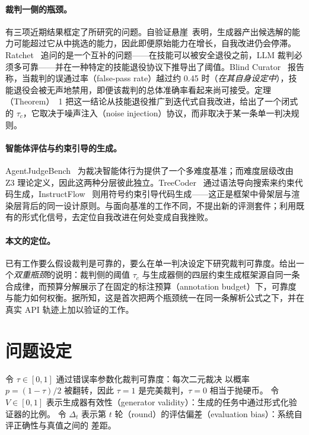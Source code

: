 \documentclass{article}
\begin{document}
\paragraph{裁判一侧的瓶颈。}
有三项近期结果框定了所研究的问题。自验证悬崖~\cite{self_verification_cliff}表明，生成器产出候选解的能力可能超过它从中挑选的能力，因此即便原始能力在增长，自我改进仍会停滞。Ratchet~\cite{ratchet} 追问的是一个互补的问题——在技能可以被安全退役之前，LLM 裁判必须多可靠——并在一种特定的技能退役协议下推导出了阈值。Blind Curator~\cite{blind_curator} 报告称，当裁判的误通过率（false-pass rate）越过约 0.45 时（\textit{在其自身设定中}），技能退役会被无声地禁用，即便该裁判的总体准确率看起来尚可接受。定理（Theorem）~1 把这一结论从技能退役推广到迭代式自我改进，给出了一个闭式的 $\tau_c$，它取决于噪声注入（noise injection）协议，而非取决于某一条单一判决规则。

\paragraph{智能体评估与约束引导的生成。}
AgentJudgeBench~\cite{agentjudgebench} 为裁决智能体行为提供了一个多难度基准；而难度层级改由 Z3 理论定义，因此这两种分层彼此独立。TreeCoder~\cite{treecoder} 通过语法导向搜索来约束代码生成，InstructFlow~\cite{instructflow} 则用符号约束引导代码生成——这正是框架中骨架层与渲染层背后的同一设计原则。与面向基准的工作不同，不提出新的评测套件；利用既有的形式化信号，去定位自我改进在何处变成自我挫败。

\paragraph{本文的定位。}
已有工作要么假设裁判是可靠的，要么在单一判决设定下研究裁判可靠度。给出一个\emph{双重瓶颈}的说明：裁判侧的阈值 $\tau_c$ 与生成器侧的四层约束生成框架源自同一条合成律，而预算分解展示了在固定的标注预算（annotation budget）下，可靠度与能力如何权衡。据所知，这是首次把两个瓶颈统一在同一条解析公式之下，并在真实 API 轨迹上加以验证的工作。

\section{问题设定}

令 $\tau \in [0,1]$ 通过错误率参数化裁判可靠度：每次二元裁决
以概率 $p = (1-\tau)/2$ 被翻转，因此 $\tau = 1$ 是完美裁判，$\tau = 0$ 相当于抛硬币。
令 $V \in [0,1]$ 表示生成器有效性（generator validity）：生成的任务中通过形式化验证器的比例。
令 $\Delta_t$ 表示第 $t$ 轮（round）的评估偏差（evaluation bias）：系统自评正确性与真值之间的
差距。
\end{document}
